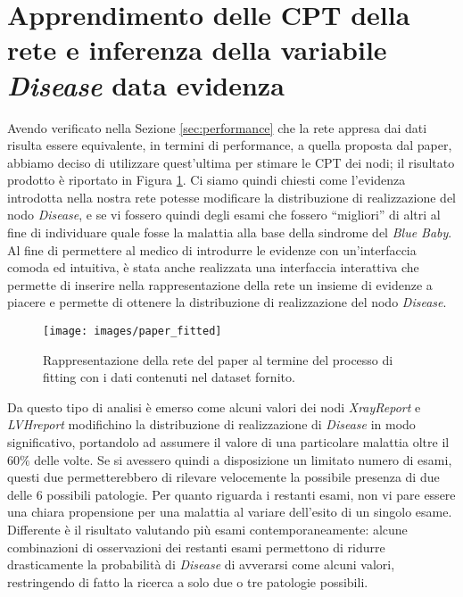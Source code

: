 \section{Apprendimento delle CPT della rete e inferenza della variabile \textit{Disease} data evidenza}
Avendo verificato nella Sezione \ref{sec:performance} che la rete appresa dai dati risulta essere equivalente, in termini di performance, a quella proposta dal paper, abbiamo deciso di utilizzare quest'ultima per stimare le CPT dei nodi; il risultato prodotto è riportato in Figura \ref{fig:paperfitted}. Ci siamo quindi chiesti come l'evidenza introdotta nella nostra rete potesse modificare la distribuzione di realizzazione del nodo \textit{Disease}, e se vi fossero quindi degli esami che fossero “migliori” di altri al fine di individuare quale fosse la malattia alla base della sindrome del \textit{Blue Baby}. Al fine di permettere al medico di introdurre le evidenze con un'interfaccia comoda ed intuitiva, è stata anche realizzata una interfaccia interattiva che permette di inserire nella rappresentazione della rete un insieme di evidenze a piacere e permette di ottenere la distribuzione di realizzazione del nodo \textit{Disease}.
\begin{figure}
	\centering
	\texttt{[image: images/paper\_fitted]}
	\caption{Rappresentazione della rete del paper al termine del processo di fitting con i dati contenuti nel dataset fornito.}
	\label{fig:paperfitted}
\end{figure}
Da questo tipo di analisi è emerso come alcuni valori dei nodi \textit{XrayReport} e \textit{LVHreport} modifichino la distribuzione di realizzazione di \textit{Disease} in modo significativo, portandolo ad assumere il valore di una particolare malattia oltre il $60\%$ delle volte. Se si avessero quindi a disposizione un limitato numero di esami, questi due permetterebbero di rilevare velocemente la possibile presenza di due delle 6 possibili patologie. Per quanto riguarda i restanti esami, non vi pare essere una chiara propensione per una malattia al variare dell'esito di un singolo esame. Differente è il risultato valutando più esami contemporaneamente: alcune combinazioni di osservazioni dei restanti esami permettono di ridurre drasticamente la probabilità di \textit{Disease} di avverarsi come alcuni valori, restringendo di fatto la ricerca a solo due o tre patologie possibili. 